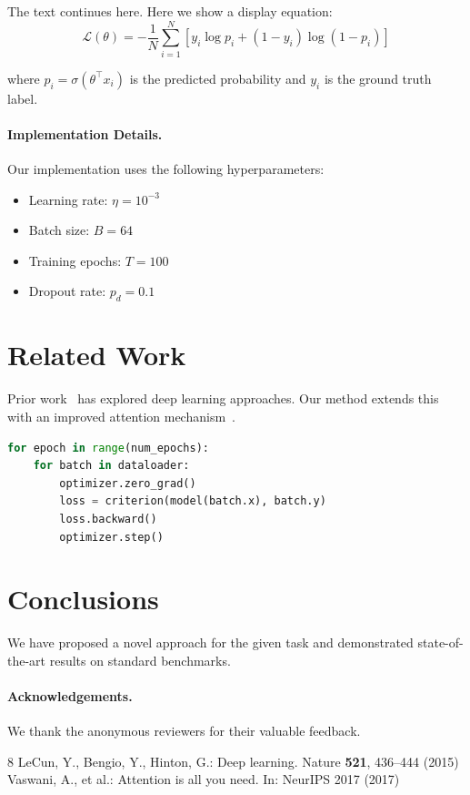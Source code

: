 \documentclass{llncs}
\begin{document}
The text continues here. Here we show a display equation:
\begin{equation}
  \mathcal{L}(\theta) = -\frac{1}{N}\sum_{i=1}^{N} \left[
    y_i \log p_i + (1-y_i)\log(1-p_i)
  \right]
  \label{eq:crossentropy}
\end{equation}

where $p_i = \sigma(\theta^\top x_i)$ is the predicted probability and $y_i$
is the ground truth label.

\paragraph{Implementation Details.}
Our implementation uses the following hyperparameters:
\begin{itemize}[noitemsep]
  \item Learning rate: $\eta = 10^{-3}$
  \item Batch size: $B = 64$
  \item Training epochs: $T = 100$
  \item Dropout rate: $p_d = 0.1$
\end{itemize}

\section{Related Work}
\label{sec:related}

Prior work~\cite{lecun2015} has explored deep learning approaches. 
Our method extends this with an improved attention mechanism~\cite{vaswani2017}.

\begin{lstlisting}[language=Python, caption=Training loop, label=lst:train]
for epoch in range(num_epochs):
    for batch in dataloader:
        optimizer.zero_grad()
        loss = criterion(model(batch.x), batch.y)
        loss.backward()
        optimizer.step()
\end{lstlisting}

\section{Conclusions}
We have proposed a novel approach for the given task and demonstrated state-of-the-art
results on standard benchmarks.

\paragraph*{Acknowledgements.}
We thank the anonymous reviewers for their valuable feedback.

\begin{thebibliography}{8}
LeCun, Y., Bengio, Y., Hinton, G.: Deep learning. Nature \textbf{521}, 436--444 (2015)
Vaswani, A., et al.: Attention is all you need. In: NeurIPS 2017 (2017)
\end{thebibliography}
\end{document}
